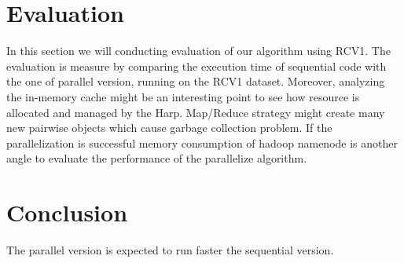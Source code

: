 \documentclass[12pt]{article}
\begin{document}
\section{Evaluation}
In this section we will conducting evaluation of our algorithm using RCV1\cite{Lewis:2004:RNB:1005332.1005345}.
The evaluation is measure by comparing the execution time of sequential code with the one of parallel version, running on the RCV1 dataset. Moreover, analyzing the in-memory cache might be an interesting point to see how resource is allocated and managed by the Harp. Map/Reduce strategy might create many new pairwise objects which cause garbage collection problem. If the parallelization is successful  memory consumption of hadoop namenode is another angle to evaluate the performance of the parallelize algorithm. 
\section{Conclusion}
The parallel version is expected to run faster the sequential version.



\end{document}

